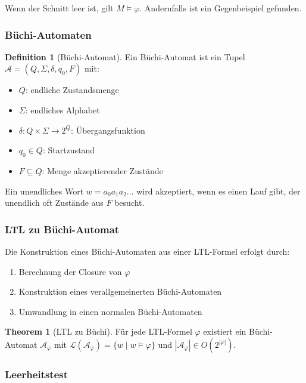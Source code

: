 ﻿\documentclass[a4paper,12pt]{article}
\theoremstyle{definition}
\newtheorem{definition}{Definition}[section]
\newtheorem{theorem}{Theorem}[section]
\begin{document}
Wenn der Schnitt leer ist, gilt $M \models \varphi$. Andernfalls ist ein Gegenbeispiel gefunden.

\subsubsection{Büchi-Automaten}

\begin{definition}[Büchi-Automat]
	Ein Büchi-Automat ist ein Tupel $\mathcal{A} = (Q, \Sigma, \delta, q_0, F)$ mit:
	\begin{itemize}
		\item[-] $Q$: endliche Zustandsmenge
		\item[-] $\Sigma$: endliches Alphabet
		\item[-] $\delta: Q \times \Sigma \to 2^Q$: Übergangsfunktion
		\item[-] $q_0 \in Q$: Startzustand
		\item[-] $F \subseteq Q$: Menge akzeptierender Zustände
	\end{itemize}
	Ein unendliches Wort $w = a_0 a_1 a_2 \ldots$ wird akzeptiert, wenn es einen Lauf gibt, der unendlich oft Zustände aus $F$ besucht.
\end{definition}

\subsubsection{LTL zu Büchi-Automat}

Die Konstruktion eines Büchi-Automaten aus einer LTL-Formel erfolgt durch:
\begin{enumerate}
	\item Berechnung der Closure von $\varphi$
	\item Konstruktion eines verallgemeinerten Büchi-Automaten
	\item Umwandlung in einen normalen Büchi-Automaten
\end{enumerate}

\begin{theorem}[LTL zu Büchi]
	Für jede LTL-Formel $\varphi$ existiert ein Büchi-Automat $\mathcal{A}_\varphi$ mit $\mathcal{L}(\mathcal{A}_\varphi) = \{w \mid w \models \varphi\}$ und $|\mathcal{A}_\varphi| \in O(2^{|\varphi|})$.
\end{theorem}

\subsubsection{Leerheitstest}
\end{document}
